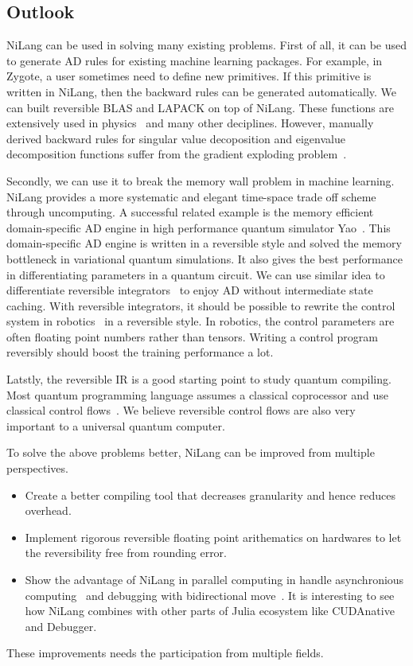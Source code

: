 \documentclass[aps,twocolumn,longbibliography,english,superscriptaddress]{revtex4-1}
\newcommand{\<}{\langle}
\renewcommand{\>}{\rangle}
\theoremstyle{definition}\newtheorem{definition}{\textit{Definition}}
\begin{document}
\subsection{Outlook}\label{sec:outlook}
NiLang can be used in solving many existing problems.
First of all, it can be used to generate AD rules for existing machine learning packages.
For example, in Zygote, a user sometimes need to define new primitives.
If this primitive is written in NiLang, then the backward rules can be generated automatically.
We can built reversible BLAS and LAPACK on top of NiLang.
These functions are extensively used in physics~\cite{Xie2020,Liao2019} and many other deciplines. However, manually derived backward rules for singular value decoposition and eigenvalue decomposition functions suffer from the gradient exploding problem~\cite{Seeger2017,Wan2019,Hubig2019}.

Secondly, we can use it to break the memory wall problem in machine learning.
NiLang provides a more systematic and elegant time-space trade off scheme through uncomputing.
A successful related example is the memory efficient domain-specific AD engine in high performance quantum simulator Yao~\cite{Luo2019}.
This domain-specific AD engine is written in a reversible style and solved the memory bottleneck in variational quantum simulations. It also gives the best performance in differentiating parameters in a quantum circuit.
We can use similar idea to differentiate reversible integrators~\cite{Hut1995, Laikov2018} to enjoy AD without intermediate state caching.
With reversible integrators, it should be possible to rewrite the control system in robotics~\cite{Giftthaler2017} in a reversible style. In robotics, the control parameters are often floating point numbers rather than tensors.
Writing a control program reversibly should boost the training performance a lot.

Latstly, the reversible IR is a good starting point to study quantum compiling. Most quantum programming language assumes a classical coprocessor and use classical control flows~\cite{Svore2018}.
We believe reversible control flows are also very important to a universal quantum computer.

To solve the above problems better, NiLang can be improved from multiple perspectives.
\begin{itemize}
    \item Create a better compiling tool that decreases granularity and hence reduces overhead.
    \item Implement rigorous reversible floating point arithematics on hardwares to let the reversibility free from rounding error.
    \item Show the advantage of NiLang in parallel computing in handle asynchronious computing~\cite{Jefferson1985} and debugging with bidirectional move~\cite{Boothe2000}. It is interesting to see how NiLang combines with other parts of Julia ecosystem like CUDAnative~\cite{Besard2018} and Debugger.
\end{itemize}
These improvements needs the participation from multiple fields.
\end{document}
